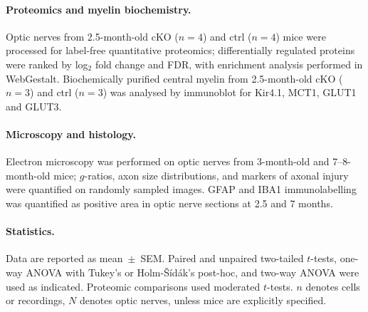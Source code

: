 \documentclass[11pt,a4paper]{article}
\begin{document}
\paragraph{Proteomics and myelin biochemistry.} Optic nerves from 2.5-month-old cKO ($n=4$) and ctrl ($n=4$) mice were processed for label-free quantitative proteomics; differentially regulated proteins were ranked by log$_2$ fold change and FDR, with enrichment analysis performed in WebGestalt. Biochemically purified central myelin from 2.5-month-old cKO ($n=3$) and ctrl ($n=3$) was analysed by immunoblot for Kir4.1, MCT1, GLUT1 and GLUT3.

\paragraph{Microscopy and histology.} Electron microscopy was performed on optic nerves from 3-month-old and 7--8-month-old mice; $g$-ratios, axon size distributions, and markers of axonal injury were quantified on randomly sampled images. GFAP and IBA1 immunolabelling was quantified as positive area in optic nerve sections at 2.5 and 7 months.

\paragraph{Statistics.} Data are reported as mean~$\pm$~SEM. Paired and unpaired two-tailed $t$-tests, one-way ANOVA with Tukey's or Holm-\v{S}{\'i}d{\'a}k's post-hoc, and two-way ANOVA were used as indicated. Proteomic comparisons used moderated $t$-tests. $n$ denotes cells or recordings, $N$ denotes optic nerves, unless mice are explicitly specified.



\end{document}
